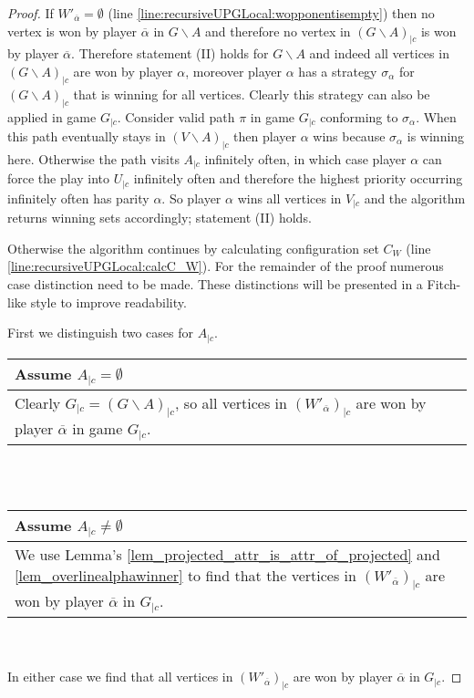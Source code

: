 \begin{theorem}
\begin{proof}
		If $W'_{\overline{\alpha}} = \emptyset$ (line \ref{line:recursiveUPGLocal:wopponentisempty}) then no vertex is won by player $\overline{\alpha}$ in $G\backslash A$ and therefore no vertex in $(G\backslash A)_{|c}$ is won by player $\overline{\alpha}$. Therefore statement (II) holds for $G\backslash A$ and indeed all vertices in $(G\backslash A)_{|c}$ are won by player $\alpha$, moreover player $\alpha$ has a strategy $\sigma_\alpha$ for $(G\backslash A)_{|c}$ that is winning for all vertices. Clearly this strategy can also be applied in game $G_{|c}$. Consider valid path $\pi$ in game $G_{|c}$ conforming to $\sigma_\alpha$. When this path eventually stays in $(V \backslash A)_{|c}$ then player $\alpha$ wins because $\sigma_\alpha$ is winning here. Otherwise the path visits $A_{|c}$ infinitely often, in which case player $\alpha$ can force the play into $U_{|c}$ infinitely often and therefore the highest priority occurring infinitely often has parity $\alpha$. So player $\alpha$ wins all vertices in $V_{|c}$ and the algorithm returns winning sets accordingly; statement (II) holds.
		
		Otherwise the algorithm continues by calculating configuration set $C_W$ (line \ref{line:recursiveUPGLocal:calcC_W}). For the remainder of the proof numerous case distinction need to be made. These distinctions will be presented in a Fitch-like style to improve readability.
		
		First we distinguish two cases for $A_{|c}$.
		
		\begin{tabular}{|p{14.2cm}}
			Assume $A_{|c} = \emptyset$\\
			\hline
			Clearly $G_{|c} = (G\backslash A)_{|c}$, so all vertices in $(W'_{\overline{\alpha}})_{|c}$ are won by player $\overline{\alpha}$ in game $G_{|c}$.
		\end{tabular}\\\\
		\begin{tabular}{|p{14.2cm}}
			Assume $A_{|c} \neq \emptyset$\\
			\hline
			We use Lemma's \ref{lem_projected_attr_is_attr_of_projected} and \ref{lem_overlinealphawinner} to find that the vertices in $(W'_{\overline{\alpha}})_{|c}$ are won by player $\overline{\alpha}$ in $G_{|c}$.
		\end{tabular}\\\\
		In either case we find that all vertices in $(W'_{\overline{\alpha}})_{|c}$ are won by player $\overline{\alpha}$ in $G_{|c}$.
		

\end{proof}
\end{theorem}
